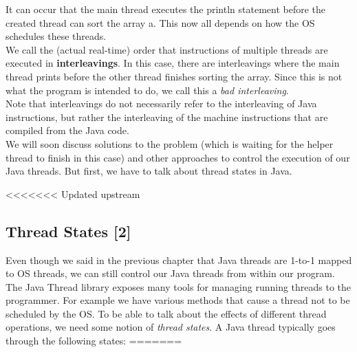 \documentclass[main.tex]{subfiles}
\begin{document}
It can occur that the main thread executes the println statement before the created thread can sort the array a. This now all depends on how the OS schedules these threads.\\
We call the (actual real-time) order that instructions of multiple threads are executed in \textbf{interleavings}. In this case, there are interleavings where the main thread prints before the other thread finishes sorting the array. Since this is not what the program is intended to do, we call this a \textit{bad interleaving}. \\[3mm]
Note that interleavings do not necessarily refer to the interleaving of Java instructions, but rather the interleaving of the machine instructions that are compiled from the Java code.\\
We will soon discuss solutions to the problem (which is waiting for the helper thread to finish in this case) and other approaches to control the execution of our Java threads. But first, we have to talk about thread states in Java.

<<<<<<< Updated upstream
\subsection{Thread States [2]}
Even though we said in the previous chapter that Java threads are 1-to-1 mapped to OS threads, we can still control our Java threads from within our program. The Java Thread library exposes many tools for managing running threads to the programmer. For example we have various methods that cause a thread not to be scheduled by the OS. To be able to talk about the effects of different thread operations, we need some notion of \textit{thread states}. A Java thread typically goes through the following states:
=======
\end{document}
